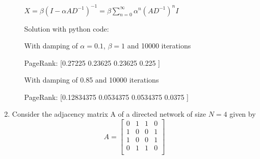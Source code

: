 \documentclass{amsart}
\theoremstyle{definition}
\theoremstyle{remark}
\numberwithin{equation}{section}
\begin{document}
\begin{enumerate}
\begin{enumerate}
$X = \beta \left(I - \alpha AD^{-1}\right)^{-1} = \beta \sum_{n=0}^{\infty} \alpha^{n}\left(AD^{-1}\right)^{n}I$ \vspace{0.2cm}


Solution with python code: \vspace{0.2cm}


With damping of $\alpha = 0.1$, $\beta = 1$ and 10000 iterations \vspace{0.2cm}

PageRank: [0.27225 0.23625 0.23625 0.225  ]

\vspace{0.2cm}

With damping of 0.85 and 10000 iterations \vspace{0.2cm}

PageRank: [0.12834375 0.0534375  0.0534375  0.0375    ]







\end{enumerate}
\clearpage

\item 
Consider the adjacency matrix A of a directed network of size $N = 4$ given by \vspace{0.2cm}
\begin{equation*}
{A}  = \left\lbrack\begin{array}{cccc}
0 & 1 & 1 & 0 \\
1 & 0 & 0 & 1 \\
1 & 0 & 0 & 1 \\
0 & 1 & 1 & 0 \\
\end{array}\right\rbrack
\end{equation*}


\end{enumerate}
\end{document}
